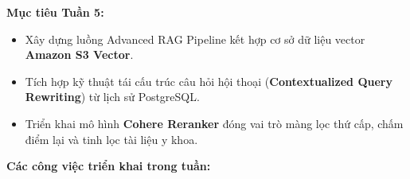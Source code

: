 \vspace{0.5em}\noindent\textbf{Mục tiêu Tuần 5:}

\begin{itemize}
\tightlist
\item
  Xây dựng luồng Advanced RAG Pipeline kết hợp cơ sở dữ liệu vector
  \textbf{Amazon S3 Vector}.
\item
  Tích hợp kỹ thuật tái cấu trúc câu hỏi hội thoại
  (\textbf{Contextualized Query Rewriting}) từ lịch sử PostgreSQL.
\item
  Triển khai mô hình \textbf{Cohere Reranker} đóng vai trò màng lọc thứ
  cấp, chấm điểm lại và tinh lọc tài liệu y khoa.
\end{itemize}

\vspace{0.5em}\noindent\textbf{Các công việc triển khai trong tuần:}

